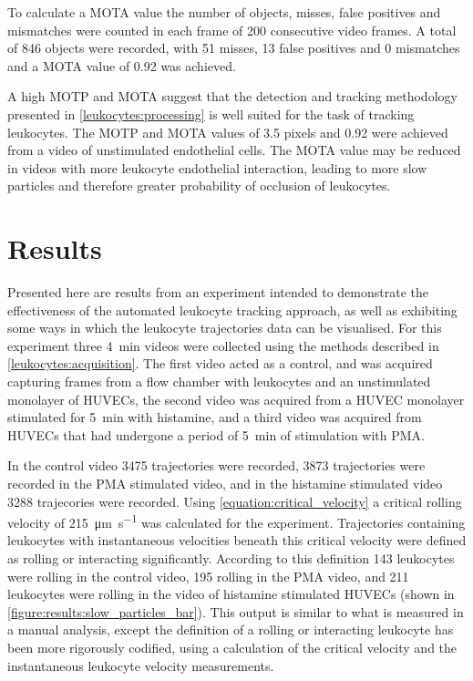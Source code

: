 To calculate a MOTA value the number of objects, misses, false positives and mismatches were counted in each frame of 200 consecutive video frames. A total of 846 objects were recorded, with 51 misses, 13 false positives and 0 mismatches and a MOTA value of 0.92 was achieved.

A high MOTP and MOTA suggest that the detection and tracking methodology presented in \autoref{leukocytes:processing} is well suited for the task of tracking leukocytes. The MOTP and MOTA values of 3.5 pixels and 0.92 were achieved from a video of unstimulated endothelial cells. The MOTA value may be reduced in videos with more leukocyte endothelial interaction, leading to more slow particles and therefore greater probability of occlusion of leukocytes.

\section{Results}
\label{leukocytes:results}
Presented here are results from an experiment intended to demonstrate the effectiveness of the automated leukocyte tracking approach, as well as exhibiting some ways in which the leukocyte trajectories data can be visualised. For this experiment three \SI{4}{\minute} videos were collected using the methods described in \autoref{leukocytes:acquisition}. The first video acted as a control, and was acquired capturing frames from a flow chamber with leukocytes and an unstimulated monolayer of HUVECs, the second video was acquired from a HUVEC monolayer stimulated for  \SI{5}{\minute} with histamine, and a third video was acquired from HUVECs that had undergone a period of \SI{5}{\minute} of stimulation with PMA.

In the control video 3475 trajectories were recorded, 3873 trajectories were recorded in the PMA stimulated video, and in the histamine stimulated video 3288 trajecories were recorded. Using \autoref{equation:critical_velocity} a critical rolling velocity of \SI{215}{\micro\meter\per\second} was calculated for the experiment. Trajectories containing leukocytes with instantaneous velocities beneath this critical velocity were defined as rolling or interacting significantly. According to this definition 143 leukocytes were rolling in the control video, 195 rolling in the PMA video, and 211 leukocytes were rolling in the video of histamine stimulated HUVECs (shown in \autoref{figure:results:slow_particles_bar}). This output is similar to what is measured in a manual analysis, except the definition of a rolling or interacting leukocyte has been more rigorously codified, using a calculation of the critical velocity and the instantaneous leukocyte velocity measurements.

